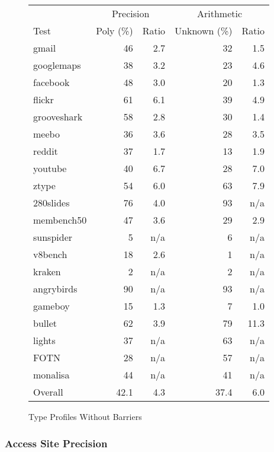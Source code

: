 \begin{figure}[ht]
\centering
\begin{tabular}{lrrrr}
\toprule
     & \multicolumn{2}{c}{Precision}
     & \multicolumn{2}{c}{Arithmetic} \\
\cmidrule(r){2-3}
\cmidrule{4-5}
Test & Poly (\%) & Ratio & Unknown (\%) & Ratio \\
\midrule
gmail          & 46 & 2.7 & 32 & 1.5 \\
googlemaps     & 38 & 3.2 & 23 & 4.6 \\
facebook       & 48 & 3.0 & 20 & 1.3 \\
flickr         & 61 & 6.1 & 39 & 4.9 \\
grooveshark    & 58 & 2.8 & 30 & 1.4 \\
meebo          & 36 & 3.6 & 28 & 3.5 \\
reddit         & 37 & 1.7 & 13 & 1.9 \\
youtube        & 40 & 6.7 & 28 & 7.0 \\
ztype          & 54 & 6.0 & 63 & 7.9 \\
280slides      & 76 & 4.0 & 93 & n/a \\
membench50     & 47 & 3.6 & 29 & 2.9 \\
\midrule
sunspider      & 5 & n/a & 6 & n/a \\
v8bench        & 18 & 2.6 & 1 & n/a \\
kraken         & 2 & n/a & 2 & n/a \\
\midrule
angrybirds     & 90 & n/a & 93 & n/a \\
gameboy        & 15 & 1.3 & 7 & 1.0 \\
bullet         & 62 & 3.9 & 79 & 11.3 \\
lights         & 37 & n/a & 63 & n/a \\
FOTN           & 28 & n/a & 57 & n/a \\
monalisa       & 44 & n/a & 41 & n/a \\
\midrule
Overall        & 42.1 & 4.3 & 37.4 & 6.0 \\
\bottomrule
\end{tabular}
\nocaptionrule \caption{Type Profiles Without Barriers}
\label{fig:without_barriers}
\end{figure}

\subsubsection{Access Site Precision}
\label{sec:access_objects}

